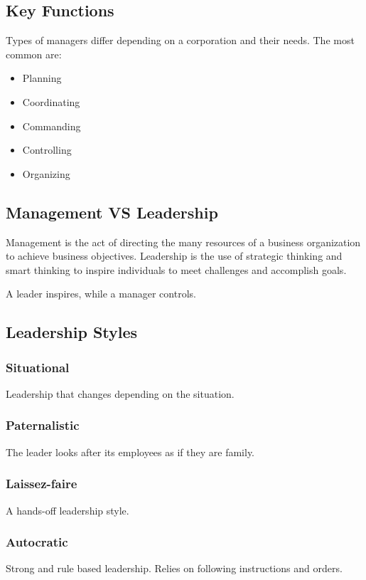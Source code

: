 \documentclass{standalone}
\begin{document}
\subsection{Key Functions}
Types of managers differ depending on a corporation and their needs.
The most common are:
\begin{itemize}
	\item Planning
	\item Coordinating
	\item Commanding
	\item Controlling
	\item Organizing
\end{itemize}

\subsection{Management VS Leadership}
Management is the act of directing the many resources of a business organization to achieve business objectives.
Leadership is the use of strategic thinking and smart thinking to inspire individuals to meet challenges and accomplish goals.

A leader inspires, while a manager controls.

\subsection{Leadership Styles}
\subsubsection{Situational}
Leadership that changes depending on the situation.

\subsubsection{Paternalistic}
The leader looks after its employees as if they are family.

\subsubsection{Laissez-faire}
A hands-off leadership style.

\subsubsection{Autocratic}
Strong and rule based leadership.
Relies on following instructions and orders.
\end{document}
